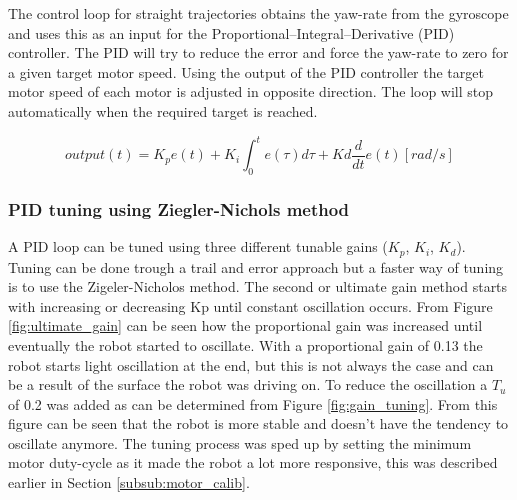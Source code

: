 
The control loop for straight trajectories obtains the yaw-rate from the gyroscope and uses this as an input for the Proportional–Integral–Derivative (PID) controller.
The PID will try to reduce the error and force the yaw-rate to zero for a given target motor speed.
Using the output of the PID controller the target motor speed of each motor is adjusted in opposite direction.
The loop will stop automatically when the required target is reached.

\begin{equation}
output(t) = K_{p}e(t) + K_{i} \int_{0}^{t}e(\tau)d\tau + Kd\frac{d}{dt}e(t) [rad/s]
\end{equation}

\subsubsection{PID tuning using Ziegler-Nichols method}


A PID loop can be tuned using three different tunable gains ($K_{p}$, $K_{i}$, $K_{d}$).
Tuning can be done trough a trail and error approach but a faster way of tuning is to use the Zigeler-Nicholos method.
The second or ultimate gain method starts with increasing or decreasing Kp until constant oscillation occurs.
From Figure \ref{fig:ultimate_gain} can be seen how the proportional gain was increased until eventually the robot started to oscillate.
With a proportional gain of 0.13 the robot starts light oscillation at the end, but this is not always the case and can be a result of the surface the robot was driving on.
To reduce the oscillation a $T_{u}$ of 0.2 was added as can be determined from Figure \ref{fig:gain_tuning}.
From this figure can be seen that the robot is more stable and doesn't have the tendency to oscillate anymore.
The tuning process was sped up by setting the minimum motor duty-cycle as it made the robot a lot more responsive, this was described earlier in Section \ref{subsub:motor_calib}.

